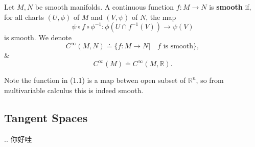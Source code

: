 \begin{definition}
    Let $M,N$ be smooth manifolds. A continuous function $f: M \to N$ is \textbf{smooth} if, for all charts $(U,\phi)$ of $M$ and $(V,\psi)$ of $N$, the map 
    \[
    \psi \circ f \circ \phi^{-1}: \phi(U \cap f^{-1}(V)) \to \psi(V) \tag{1.1}
    \]
    is smooth.
    We denote
    \[C^{\infty}(M,N) \doteq \{f:M \to N | \quad f \text{ is smooth}\},\] 
    \&  
    \[C^{\infty}(M) \doteq C^{\infty}(M,\mathbb{R}).\]
\end{definition}

Note the function in (1.1) is a map betwen open subset of $\mathbb{R}^n$, so from multivariable calculus this is indeed smooth.

\subsection{Tangent Spaces}
..
你好哇